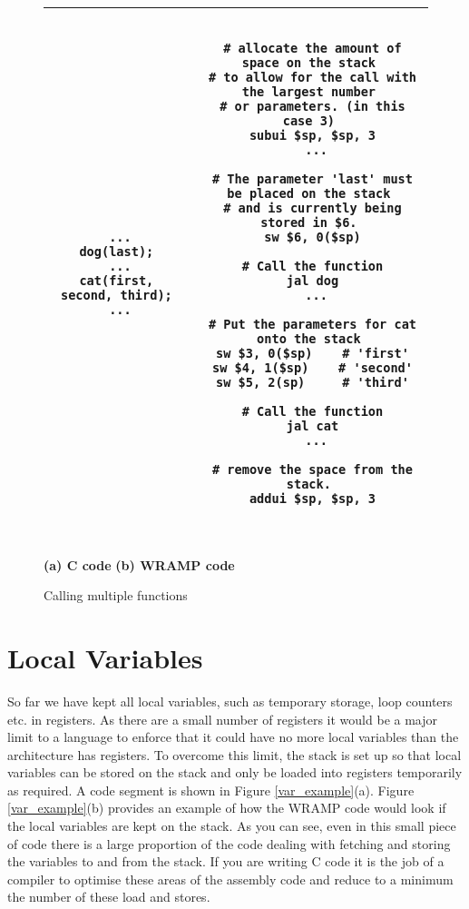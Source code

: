 %
%
\begin{figure}[!hbtp]
\begin{footnotesize}
\begin{center}
\begin{tabular}{|c|c|}
\hline
\begin{minipage}[t]{5cm}
\begin{verbatim}

 ...
dog(last);
 ...
cat(first, second, third);
 ...

\end{verbatim}
\end{minipage}
&
\begin{minipage}[t]{8cm}
\begin{verbatim}

 # allocate the amount of space on the stack
 # to allow for the call with the largest number
 # or parameters. (in this case 3)
 subui $sp, $sp, 3
  ...

 # The parameter 'last' must be placed on the stack
 # and is currently being stored in $6.
 sw $6, 0($sp)

 # Call the function
 jal dog
  ...

 # Put the parameters for cat onto the stack
 sw $3, 0($sp)    # 'first'
 sw $4, 1($sp)    # 'second'
 sw $5, 2(sp)     # 'third'

 # Call the function
 jal cat
  ...

 # remove the space from the stack.
 addui $sp, $sp, 3

\end{verbatim}
\end{minipage}
\\
\hline
\end{tabular}
\\
\textbf{(a) C code}
\hspace{3.5cm}
\textbf{(b) WRAMP code}
\end{center}
\end{footnotesize}

\caption{Calling multiple functions}
\label{fig:paramcalling}
\end{figure}

\section{Local Variables}
So far we have kept all local variables, such as temporary storage,
loop counters etc. in registers. As there are a small number of
registers it would be a major limit to a language to enforce that it
could have no more local variables than the architecture has
registers. To overcome this limit, the stack is set up so that local
variables can be stored on the stack and only be loaded into registers
temporarily as required. A code segment is shown in Figure
\ref{var_example}(a). Figure \ref{var_example}(b) provides an example
of how the WRAMP code would look if the local variables are kept on the
stack. As you can see, even in this small piece of code there is a
large proportion of the code dealing with fetching and storing the
variables to and from the stack. If you are writing C code it is the
job of a compiler to optimise these areas of the assembly code and
reduce to a minimum the number of these load and stores.

